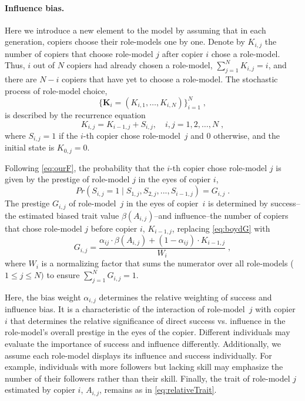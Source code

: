 \documentclass[12pt]{extarticle}
\let\vec\mathbf
\begin{document}
\paragraph{Influence bias.}
Here we introduce a new element to the model by assuming that in each generation, copiers choose their role-models one by one.
{Denote by} $K_{i,j}$  the number of copiers that {choose} role-model $j$ after copier $i$ chose a role-model. Thus, $i$ out of $N$ copiers {had} already {chosen} a role-model, $\sum_{j=1}^N{K_{i,j}} = i$, and there are $N-i$ copiers that have yet to choose a role-model.
The stochastic process of role-model choice, 
\begin{equation} \label{eq:process}
\big\{\vec{K}_i = (K_{i,1}, \ldots, K_{i,N}) \big\}_{i=1}^N \;,
\end{equation}
is described by the recurrence equation
\begin{equation} \label{eq:recurrence}
K_{i,j} = K_{i-1,j} + S_{i,j}, \quad i,j=1,2,\ldots,N \;,
\end{equation}
where $S_{i,j}=1$ if the $i$-th copier chose role-model~$j$ and 0 otherwise, and the initial state is $K_{0,j}=0$.

Following \cref{eq:ourF}, the probability that the $i$-th copier chose role-model $j$ is given by the prestige of role-model $j$ in the eyes of copier $i$,
\begin{equation}\label{eq:recPrestige}
Pr(S_{i,j}=1 \mid S_{1,j},S_{2,j},...,S_{i-1,j}) = G_{i,j} \;.
\end{equation}
The prestige $G_{i,j}$ of role-model~$j$ in the eyes of copier~$i$ is determined by success--the estimated biased trait value $\beta(A_{i,j})$--and influence--the number of copiers that chose role-model $j$ before copier $i$, $K_{i-1,j}$, replacing \cref{eq:boydG} with
\begin{equation}\label{eq:prestige}
G_{i,j} = \frac{\alpha_{ij} \cdot \beta(A_{i,j}) + (1-\alpha_{ij}) \cdot K_{i-1,j}}{W_i} \;,
\end{equation}
where $W_i$ is a normalizing factor that sums the numerator over all role-models ($1\le j \le N)$ to ensure $\sum_{j=1}^{N}{G_{i,j}}=1$.

Here, the bias weight $\alpha_{i,j}$ determines the relative weighting of success and influence bias. It is a characteristic of the interaction of role-model~$j$ with copier $i$ that determines the relative significance of direct success vs. influence in the role-model's overall prestige in the eyes of the copier.
Different individuals may evaluate the importance of success and influence differently. Additionally, we assume each role-model displays its influence and success individually. For example, individuals with more followers but lacking skill may emphasize the number of their followers rather than their skill.
Finally, the trait of role-model $j$ estimated by copier $i$, $A_{i,j}$, remains as in \cref{eq:relativeTrait}.
\end{document}

